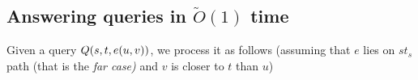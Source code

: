 \begin{comment}
We are now ready to describe our data-structure to process queries. We first need
to check the vertex to be avoided is an intersection point in \SBFS$(t)$. To this end,
we check if the vertex exists in $\BST_1(t)$. If yes, then we return the length of the
preferred path associated with the vertex. The size of
$\BST_1(t)$ is $O(\sigma) = O(\sqrt{n \sigma})$ as there are $O(\sigma)$ intersection
point in \SBFS$(t)$.


Let $xy$ be a segment in \SBFS$(t)$.  We will associate two data structures with
$x$, (1) $D_0(x,t)$ contains   the preferred replacement path from $x$ to $t$
such that its detour starts in segment $xy$, but the avoided vertex lies in $yt$,
that is, that path in $\TON$ (2) $\BST_2(x,t)$ contains all the  preferred path
from $x$ to $t$ such that their detour start in segment $xy$ and the avoided
vertex also lies in $xy$, that is, paths in $\TTW$. As in the single source case,
we first show that each path in $\BST_2(x,t)$ avoid a contiguous subpath of $xy$.

By Corollary \ref{cor:arrange}, we can arrange paths in $\BST_2(x,t)$ in decreasing order of their length. By
Lemma \ref{lem:avoids}, for any two path $P,P' \in \BST_2(x,t)$, if $|P| > |P'|$, then $\DET(P')$
starts below the vertex avoided by $P$. This lemma implies
that $\DET(P')$ starts below all the vertices avoided by
$P$. Thus $P$ avoids some contiguous path in $xy$ path.
We can $\BST_2(x,t)$ as a balanced binary search tree. For each subpath $zz'$ of $xy$,
we store the length of the replacement path from $x$ whose detour starts before $z$ and it
meets $xt$ path again in $t_xt$.  Additionally, we also store the distance of $z$ and $z'$
from $x$. These distances will act as the key of a node in $\BST_2(x,t)$.
\end{comment}
\iflong
\else
\vspace{-2mm}
\fi
\subsection{Answering queries in $\tilde O(1)$ time}
\iflong
\else
\vspace{-2mm}
\fi
Given a query ${\sc Q}(s,t,e(u,v))$, we process it as follows
(assuming that $e$ lies on $st_s$ path (that is the {\em far case)} and $v$ is closer to $t$ than $u$)\iflong\\\else\vspace{1mm}\fi


